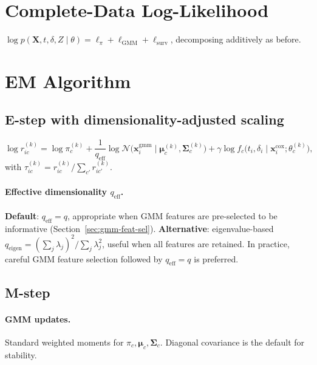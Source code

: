 \documentclass[11pt]{article}
\newcommand{\bx}{\mathbf{x}}
\newcommand{\bX}{\mathbf{X}}
\newcommand{\bmu}{\boldsymbol{\mu}}
\newcommand{\bSigma}{\boldsymbol{\Sigma}}
\newenvironment{revblock}{\color{revcolor}}{}
\begin{document}
\section{Complete-Data Log-Likelihood}

$\log p(\bX,t,\delta,Z\mid\theta) = \ell_\pi + \ell_{\mathrm{GMM}} + \ell_{\mathrm{surv}}$, decomposing additively as before.


\section{EM Algorithm}

\subsection{E-step with dimensionality-adjusted scaling}
\begin{equation}\label{eq:estep}
  \log r_{ic}^{(k)} = \log\pi_c^{(k)} + \frac{1}{q_{\mathrm{eff}}}\log\mathcal{N}\!\bigl(\bx_i^{\mathrm{gmm}}\mid\bmu_c^{(k)},\bSigma_c^{(k)}\bigr) + \gamma\log f_c\!\bigl(t_i,\delta_i\mid\bx_i^{\mathrm{cox}};\theta_c^{(k)}\bigr),
\end{equation}
with $\tau_{ic}^{(k)} = r_{ic}^{(k)} / \sum_{c'} r_{ic'}^{(k)}$.

\begin{revblock}
\paragraph{Effective dimensionality $q_{\mathrm{eff}}$.}
\textbf{Default}: $q_{\mathrm{eff}} = q$, appropriate when GMM features are pre-selected to be informative (Section~\ref{sec:gmm-feat-sel}). \textbf{Alternative}: eigenvalue-based $q_{\mathrm{eigen}} = (\sum_j \lambda_j)^2/\sum_j \lambda_j^2$, useful when all features are retained. In practice, careful GMM feature selection followed by $q_{\mathrm{eff}}=q$ is preferred.
\end{revblock}

\subsection{M-step}

\paragraph{GMM updates.}
Standard weighted moments for $\pi_c, \bmu_c, \bSigma_c$. Diagonal covariance is the default for stability.
\end{document}
